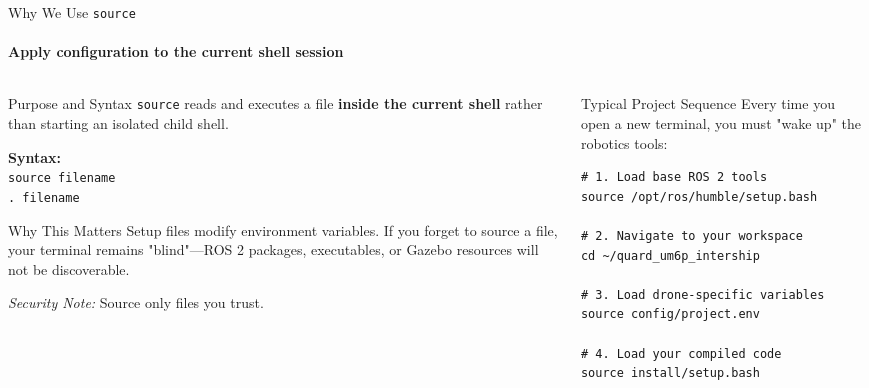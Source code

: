 \begin{frame}[fragile]{Why We Use \texttt{source}}
\framesubtitle{Apply configuration to the current shell session}

\footnotesize

\begin{columns}[T,onlytextwidth]

    \begin{column}{0.48\textwidth}
        \begin{block}{Purpose and Syntax}
            \texttt{source} reads and executes a file \textbf{inside the current shell} rather than starting an isolated child shell. 
            
            \vspace{0.15cm}
            \textbf{Syntax:} \\
            \texttt{source filename} \\
            \texttt{.\ filename}
        \end{block}
        
        \begin{alertblock}{Why This Matters}
            Setup files modify environment variables. If you forget to source a file, your terminal remains "blind"---ROS 2 packages, executables, or Gazebo resources will not be discoverable.
            
            \vspace{0.15cm}
            \textit{Security Note:} Source only files you trust.
        \end{alertblock}
    \end{column}

    \begin{column}{0.48\textwidth}
        \begin{exampleblock}{Typical Project Sequence}
            Every time you open a new terminal, you must "wake up" the robotics tools:
            
\begin{verbatim}
# 1. Load base ROS 2 tools
source /opt/ros/humble/setup.bash

# 2. Navigate to your workspace
cd ~/quard_um6p_intership

# 3. Load drone-specific variables
source config/project.env

# 4. Load your compiled code
source install/setup.bash
\end{verbatim}
        \end{exampleblock}
    \end{column}

\end{columns}

\end{frame}


